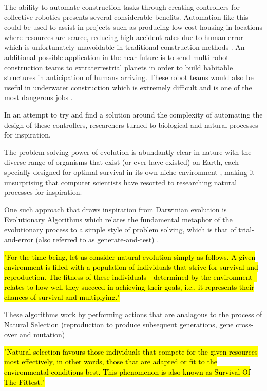 The ability to automate construction tasks through creating controllers for collective robotics presents several considerable benefits. Automation like this could be used to assist in projects such as producing low-cost housing in locations where resources are scarce, reducing high accident rates due to human error which is unfortunately unavoidable in traditional construction methods \cite{ShenKhoshnevis2003}. An additional possible application in the near future is to send multi-robot construction teams to extraterrestrial planets in order to build habitable structures in anticipation of humans arriving. These robot teams would also be useful in underwater construction which is extremely difficult and is one of the most dangerous jobs \cite{RefWorks:30}.

In an attempt to try and find a solution around the complexity of automating the design of these controllers, researchers turned to biological and natural processes for inspiration.

The problem solving power of evolution is abundantly clear in nature with the diverse range of organisms that exist (or ever have existed) on Earth, each specially designed for optimal survival in its own niche environment \cite{RefWorks:33}, making it unsurprising that computer scientists have resorted to researching natural processes for inspiration. 

One such approach that draws inspiration from Darwinian evolution is Evolutionary Algorithms which relates the fundamental metaphor of the evolutionary process to a simple style of problem solving, which is that of trial-and-error (also referred to as generate-and-test) \cite{RefWorks:33}.

\hl{"For the time being, let us consider natural evolution simply as follows. A given environment is filled with a population of individuals that strive for survival and reproduction. The fitness of these individuals - determined by the environment - relates to how well they succeed in achieving their goals, i.e., it represents their chances of survival and multiplying."} \cite{EibenSmith2003}

These algorithms work by performing actions that are analagous to the process of Natural Selection (reproduction to produce subsequent generations, gene cross-over and mutation)

\hl{"Natural selection favours those individuals that compete for the given resources most effectively, in other words, those that are adapted or fit to the environmental conditions best. This phenomenon is also known as Survival Of The Fittest."} \cite{EibenSmith2003}




